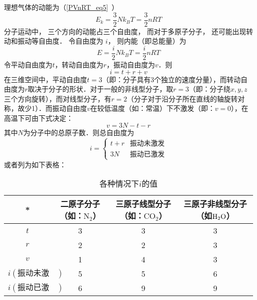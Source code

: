 
\begin{issues}
\issueDraft
\end{issues}


理想气体的动能为（\autoref{PVnRT_eq5}~）
\begin{equation}
E_k = \frac32 Nk_B T = \frac{3}{2}nRT
\end{equation}
分子运动中， 三个方向的动能占三个自由度， 而对于多原子分子， 还可能出现转动和振动等自由度． 令自由度为 $i$， 则内能（即总能量）为
\begin{equation}\label{IdgEng_eq1}
E = \frac{i}{2}Nk_B T = \frac{i}{2}nRT
\end{equation}
令平动自由度为$t$，转动自由度为$r$，振动自由度为$v$．则
\begin{equation}
i=t+r+v
\end{equation}
在三维空间中，平动自由度$t=3$（即：分子具有3个独立的速度分量），而转动自由度为$r$取决于分子的形状．对于一般的非线型分子，取$r=3$（即：分子绕$x,y,z$三个方向旋转），而对线型分子，有$r=2$（分子对于沿分子所在直线的轴旋转对称，故少1）．而振动自由度$v$在较低温度（如：常温）下不激发（即：$v=0$），在高温下可由下式决定：
\begin{equation}
v=3N-t-r
\end{equation}
其中$N$为分子中的总原子数．则总自由度为
\begin{equation}
i=\left\{\begin{matrix}{t+r}&{\text{振动未激发}}\\{3N}&{\text{振动已激发}}\end{matrix}\right.
\end{equation}
或者列为如下表格：\begin{table}[ht]
\centering
\caption{各种情况下$i$的值}\label{IdgEng_tab1}
\begin{tabular}{|c|c|c|c|}
\hline
* & 二原子分子（如：$\text{N}_2$） & 三原子线型分子（如：$\text{CO}_2$） & 三原子非线型分子（如$\text H_2\text O$） \\
\hline
$t$ & 3 & 3 & 3 \\
\hline
$r$ & 2 & 2 & 3 \\
\hline
$v$ & 1 & 4 & 3 \\
\hline
$i(\text{振动未激发})$ & 5 & 5 & 6 \\
\hline
$i(\text{振动已激发})$ & 6 & 9 & 9 \\
\hline
\end{tabular}
\end{table}